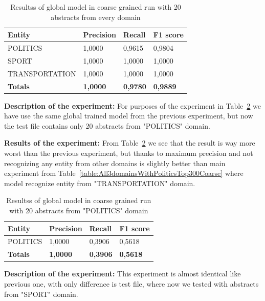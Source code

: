\documentclass[thesis=M,english]{FITthesis}[2018/05/30]
\begin{document}
	\begin{table}[H]\centering
		\begin{tabular}{|l|l|l|l|}
			\hline {\textbf{Entity}} & {\textbf{Precision}} & {\textbf{Recall}} & {\textbf{F1 score}}\\\hline
				POLITICS & 1,0000 & 0,9615 & 0,9804\\
				SPORT & 1,0000 & 1,0000 & 1,0000\\
				TRANSPORTATION & 1,0000 & 1,0000 & 1,0000\\\hline
				\textbf{Totals} & \textbf{1,0000} & \textbf{0,9780} & \textbf{0,9889}\\\hline
		\end{tabular}
		\caption{Resultss of global model in coarse grained run with 20 abstracts from every domain \label{table:GlobalDomainWithAllAbstractsTop20Coarse}}
	\end{table}

\textbf{Description of the experiment:} For purposes of the experiment in Table~\ref{table:GlobalDomainWithPoliticsTop20Coarse} we have use the same global trained model from the previous experiment, but now the test file contains only 20 abstracts from "POLITICS" domain. 

\textbf{Results of the experiment:} From Table~\ref{table:GlobalDomainWithPoliticsTop20Coarse} we see that the result is way more worst than the previous experiment, but thanks to maximum precision and not recognizing any entity from other domains is slightly better than main experiment from Table~\ref{table:All3domainsWithPoliticsTop300Coarse} where model recognize entity from "TRANSPORTATION" domain.

	\begin{table}[H]\centering
		\begin{tabular}{|l|l|l|l|}
			\hline {\textbf{Entity}} & {\textbf{Precision}} & {\textbf{Recall}} & {\textbf{F1 score}}\\\hline
				POLITICS & 1,0000 & 0,3906 & 0,5618\\\hline
				\textbf{Totals} & \textbf{1,0000} & \textbf{0,3906} & \textbf{0,5618}\\\hline
		\end{tabular}
		\caption{Resultss of global model in coarse grained run with 20 abstracts from "POLITICS" domain \label{table:GlobalDomainWithPoliticsTop20Coarse}}
	\end{table}

\textbf{Description of the experiment:} This experiment is almost identical like previous one, with only difference is test file, where now we tested with abstracts from "SPORT" domain.
\end{document}
